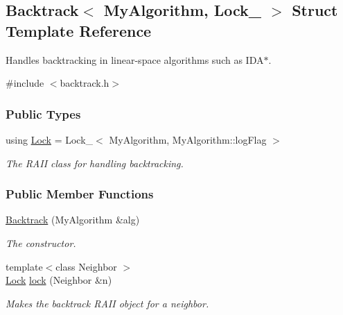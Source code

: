 \hypertarget{structBacktrack}{}\subsection{Backtrack$<$ My\+Algorithm, Lock\+\_\+ $>$ Struct Template Reference}
\label{structBacktrack}


Handles backtracking in linear-\/space algorithms such as I\+D\+A$\ast$.  




{\ttfamily \#include $<$backtrack.\+h$>$}

\subsubsection*{Public Types}
\begin{DoxyCompactItemize}
\item 
using \hyperlink{structBacktrack_a68d17266db42932663d0bbcd8cf1ea63}{Lock} = Lock\+\_\+$<$ My\+Algorithm, My\+Algorithm\+::log\+Flag $>$\hypertarget{structBacktrack_a68d17266db42932663d0bbcd8cf1ea63}{}\label{structBacktrack_a68d17266db42932663d0bbcd8cf1ea63}

\begin{DoxyCompactList}\small\item\em The R\+A\+II class for handling backtracking. \end{DoxyCompactList}\end{DoxyCompactItemize}
\subsubsection*{Public Member Functions}
\begin{DoxyCompactItemize}
\item 
\hyperlink{structBacktrack_a121173501c4f2309c7a1e407cf095adf}{Backtrack} (My\+Algorithm \&alg)\hypertarget{structBacktrack_a121173501c4f2309c7a1e407cf095adf}{}\label{structBacktrack_a121173501c4f2309c7a1e407cf095adf}

\begin{DoxyCompactList}\small\item\em The constructor. \end{DoxyCompactList}\item 
{\footnotesize template$<$class Neighbor $>$ }\\\hyperlink{structBacktrack_a68d17266db42932663d0bbcd8cf1ea63}{Lock} \hyperlink{structBacktrack_a108af93a8dfaf97acb774d3552bd5997}{lock} (Neighbor \&n)
\begin{DoxyCompactList}\small\item\em Makes the backtrack R\+A\+II object for a neighbor. \end{DoxyCompactList}\end{DoxyCompactItemize}
